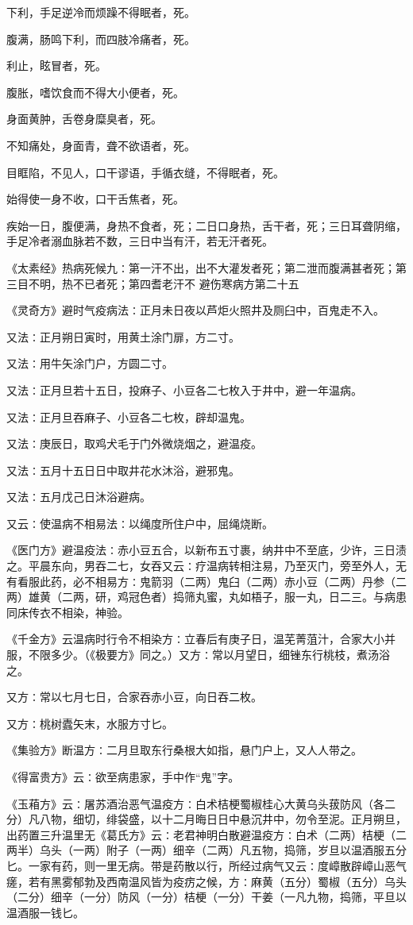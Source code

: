 \documentclass[a4paper,12pt,UTF8,twoside]{ctexbook}
\begin{document}
下利，手足逆冷而烦躁不得眠者，死。

腹满，肠鸣下利，而四肢冷痛者，死。

利止，眩冒者，死。

腹胀，嗜饮食而不得大小便者，死。

身面黄肿，舌卷身糜臭者，死。

不知痛处，身面青，聋不欲语者，死。

目眶陷，不见人，口干谬语，手循衣缝，不得眠者，死。

始得使一身不收，口干舌焦者，死。

疾始一日，腹便满，身热不食者，死；二日口身热，舌干者，死；三日耳聋阴缩，手足冷者溺血脉若不数，三日中当有汗，若无汗者死。

《太素经》热病死候九∶第一汗不出，出不大灌发者死；第二泄而腹满甚者死；第三目不明，热不已者死；第四耆老汗不
避伤寒病方第二十五

《灵奇方》避时气疫病法∶正月未日夜以芦炬火照井及厕臼中，百鬼走不入。

又法∶正月朔日寅时，用黄土涂门扉，方二寸。

又法∶用牛矢涂门户，方圆二寸。

又法∶正月旦若十五日，投麻子、小豆各二七枚入于井中，避一年温病。

又法∶正月旦吞麻子、小豆各二七枚，辟却温鬼。

又法∶庚辰日，取鸡犬毛于门外微烧烟之，避温疫。

又法∶五月十五日日中取井花水沐浴，避邪鬼。

又法∶五月戊己日沐浴避病。

又云∶使温病不相易法∶以绳度所住户中，屈绳烧断。

《医门方》避温疫法∶赤小豆五合，以新布五寸裹，纳井中不至底，少许，三日渍之。平晨东向，男吞二七，女吞又云∶疗温病转相注易，乃至灭门，旁至外人，无有看服此药，必不相易方∶鬼箭羽（二两）鬼臼（二两）赤小豆（二两）丹参（二两）雄黄（二两，研，鸡冠色者）捣筛丸蜜，丸如梧子，服一丸，日二三。与病患同床传衣不相染，神验。

《千金方》云温病时行令不相染方∶立春后有庚子日，温芜菁菹汁，合家大小并服，不限多少。（《极要方》同之。）又方∶常以月望日，细锉东行桃枝，煮汤浴之。

又方∶常以七月七日，合家吞赤小豆，向日吞二枚。

又方∶桃树蠹矢末，水服方寸匕。

《集验方》断温方∶二月旦取东行桑根大如指，悬门户上，又人人带之。

《得富贵方》云∶欲至病患家，手中作“鬼”字。

《玉葙方》云∶屠苏酒治恶气温疫方∶白术桔梗蜀椒桂心大黄乌头菝防风（各二分）凡八物，细切，绯袋盛，以十二月晦日日中悬沉井中，勿令至泥。正月朔旦，出药置三升温里无《葛氏方》云∶老君神明白散避温疫方∶白术（二两）桔梗（二两半）乌头（一两）附子（一两）细辛（二两）凡五物，捣筛，岁旦以温酒服五分匕。一家有药，则一里无病。带是药散以行，所经过病气又云∶度嶂散辟嶂山恶气瘥，若有黑雾郁勃及西南温风皆为疫疠之候，方∶麻黄（五分）蜀椒（五分）乌头（二分）细辛（一分）防风（一分）桔梗（一分）干姜（一凡九物，捣筛，平旦以温酒服一钱匕。
\end{document}
